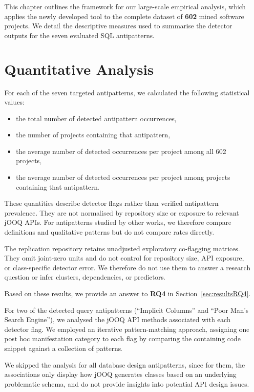 This chapter outlines the framework for our large-scale empirical analysis, which applies the newly developed tool to the complete dataset of \textbf{602} mined software projects. We detail the descriptive measures used to summarise the detector outputs for the seven evaluated SQL antipatterns.

\section{Quantitative Analysis}\label{sec:projectAnalysisQuantitative}

For each of the seven targeted antipatterns, we calculated the following statistical values:

\begin{itemize}
    \item the total number of detected antipattern occurrences,
    \item the number of projects containing that antipattern,
    \item the average number of detected occurrences per project among all \num{602} projects,
    \item the average number of detected occurrences per project among projects containing that antipattern.
\end{itemize}

These quantities describe detector flags rather than verified antipattern prevalence. They are not normalised by repository size or exposure to relevant jOOQ APIs. For antipatterns studied by other works, we therefore compare definitions and qualitative patterns but do not compare rates directly.

The replication repository retains unadjusted exploratory co-flagging matrices. They omit joint-zero units and do not control for repository size, API exposure, or class-specific detector error. We therefore do not use them to answer a research question or infer clusters, dependencies, or predictors.

Based on these results, we provide an answer to \textbf{RQ4} in Section~\ref{sec:resultsRQ4}.

For two of the detected query antipatterns (“Implicit Columns” and “Poor Man's Search Engine”), we analysed the jOOQ API methods associated with each detector flag. We employed an iterative pattern-matching approach, assigning one post hoc manifestation category to each flag by comparing the containing code snippet against a collection of patterns.

We skipped the analysis for all database design antipatterns, since for them, the associations only display how jOOQ generates classes based on an underlying problematic schema, and do not provide insights into potential API design issues.

